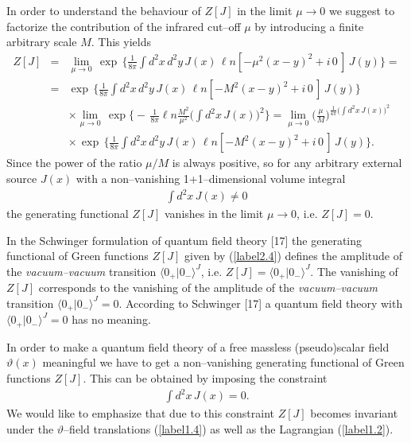 \documentclass[a4paper,12pt] {article}
\begin{document}
In order to understand the behaviour of $Z[J]$ in the limit $\mu \to
0$ we suggest to factorize the contribution of the infrared cut--off
$\mu$ by introducing a finite arbitrary scale $M$. This yields
%
\begin{eqnarray}\label{label2.7}
Z[J] &=& \lim_{\textstyle \mu \to 0}\,\exp\,\Big\{\frac{1}{8\pi}\int
d^2x\,d^2y\,J(x)\,{\ell n}[-\mu^2(x-y)^2 + i\,0\,]\,J(y)\Big\} =
\nonumber\\ &=&\exp\,\Big\{\frac{1}{8\pi}\int d^2x\,d^2y\,J(x)\,{\ell
n}[-M^2(x-y)^2 + i\,0\,]\,J(y)\Big\}\nonumber\\
&&\times\lim_{\textstyle \mu \to 0}\,\exp\Big\{-\,\frac{1}{8\pi}{\ell
n}\frac{M^2}{\mu^2}\Big(\int d^2x\,J(x)\Big)^2\Big\}=\lim_{\textstyle
\mu \to 0}\Bigg(\frac{\mu}{M}\Bigg)^{\textstyle \frac{\textstyle
1}{\textstyle 4\pi}\Big(\int d^2x\,J(x)\Big)^2} \nonumber\\ &&\times
\,\exp\,\Big\{\frac{1}{8\pi}\int d^2x\,d^2y\,J(x)\,{\ell
n}[-M^2(x-y)^2 + i\,0\,]\,J(y)\Big\}.
\end{eqnarray}
%
Since the power of the ratio $\mu/M$ is always positive, so for any
arbitrary external source $J(x)$ with a non--vanishing
1+1--dimensional volume integral
%
\begin{eqnarray}\label{label2.8}
\int d^2x\, J(x) \neq 0
\end{eqnarray}
%
the generating functional $Z[J]$ vanishes in the limit $\mu \to 0$,
i.e. $Z[J] = 0$. 

In the Schwinger formulation of quantum field theory [17] the
generating functional of Green functions $Z[J]$ given by
(\ref{label2.4}) defines the amplitude of the {\it vacuum--vacuum}
transition $\langle 0_+|0_-\rangle^J$, i.e. $Z[J] = \langle
0_+|0_-\rangle^J$. The vanishing of $Z[J]$ corresponds to the
vanishing of the amplitude of the {\it vacuum--vacuum} transition
$\langle 0_+|0_-\rangle^J = 0$. According to Schwinger [17] a quantum
field theory with $\langle 0_+|0_-\rangle^J = 0$ has no meaning.

In order to make a quantum field theory of a free massless
(pseudo)scalar field $\vartheta(x)$ meaningful we have to get a
non--vanishing generating functional of Green functions $Z[J]$. This
can be obtained by imposing the constraint
%
\begin{eqnarray}\label{label2.9}
\int d^2x\,J(x) = 0.
\end{eqnarray}
%
We would like to emphasize that due to this constraint $Z[J]$ becomes
invariant under the $\vartheta$--field translations (\ref{label1.4})
as well as the Lagrangian (\ref{label1.2}).
\end{document}
